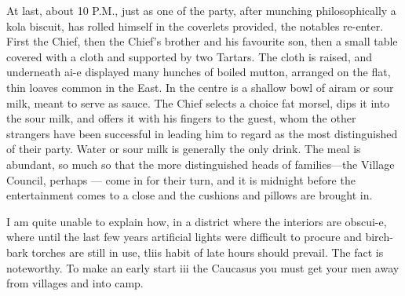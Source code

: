 \documentclass{article}
\begin{document}
	At last, about 10 P.M., just as one of the party, after munching philosophically a kola biscuit, has rolled himself in the coverlets provided, the notables re-enter. First the Chief, then the Chief's brother and his favourite son, then a small table covered with a cloth and supported by two Tartars. The cloth is raised, and underneath ai-e displayed many hunches of boiled mutton, arranged on the flat, thin loaves common in the East. In the centre is a shallow bowl of airam or sour milk, meant to serve as sauce. The Chief selects a choice fat morsel, dips it into the sour milk, and offers it with his fingers to the guest, whom the other strangers have been successful in leading him to regard as the most distinguished of their party. Water or sour milk is generally the only drink. The meal is abundant, so much so that the more distinguished heads of families—the Village Council, perhaps — come in for their turn, and it is midnight before the entertainment comes to a close and the cushions and pillows are brought in.
	
	I am quite unable to explain how, in a district where the interiors are obscui-e, where until the last few years artificial lights were difficult to procure and birch-bark torches are still in use, tliis habit of late hours should prevail. The fact is noteworthy. To make an early start iii the Caucasus you must get your men away from villages and into camp.
	
\end{document}
